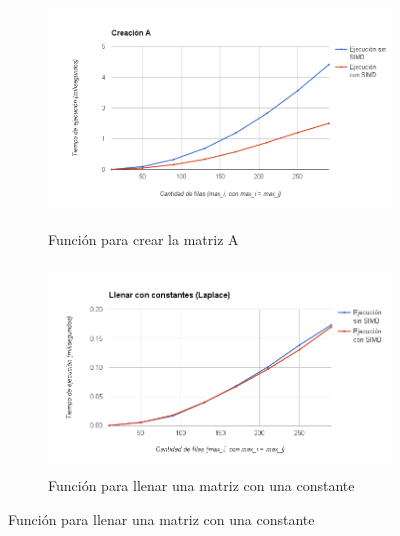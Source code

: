 \documentclass[a4paper]{article}
\begin{document}
\begin{figure}
\centering
\begin{subfigure}{.5\textwidth}
  \centering
	\hspace{-1.5cm}\includegraphics[height=6.2cm]{images/CreateA.png}
  \hspace{-1.5cm}\caption{Función para crear la matriz A}
	\label{fig:CreateA}
\end{subfigure}%
\begin{subfigure}{.5\textwidth}
  \centering
	\includegraphics[height=5.5cm, width=1.1\linewidth]{images/FillWithConstant.png}
  \caption{Función para llenar una matriz con una constante}
  \label{fig:FillWithConstant}
\end{subfigure}



\end{figure}
\end{document}

